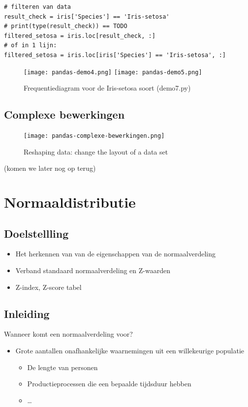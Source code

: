 \documentclass{article}
\begin{document}
\begin{verbatim}
# filteren van data
result_check = iris['Species'] == 'Iris-setosa'
# print(type(result_check)) == TODO
filtered_setosa = iris.loc[result_check, :]
# of in 1 lijn:
filtered_setosa = iris.loc[iris['Species'] == 'Iris-setosa', :]
\end{verbatim}

\begin{figure}[H]
    \centering
    \texttt{[image: pandas-demo4.png]}
    \texttt{[image: pandas-demo5.png]}
    \caption{Frequentiediagram voor de Iris-setosa soort (demo7.py)}
\end{figure}

\subsection{Complexe bewerkingen}

\begin{figure}[H]
    \centering
    \texttt{[image: pandas-complexe-bewerkingen.png]}
    \caption{Reshaping data: change the layout of a data set}
\end{figure}

(komen we later nog op terug)

\section{Normaaldistributie}

\subsection{Doelstellling}

\begin{itemize}
    \item Het herkennen van van de eigenschappen van de normaalverdeling
    \item Verband standaard normaalverdeling en Z-waarden
    \item Z-index, Z-score tabel
\end{itemize}

\subsection{Inleiding}

Wanneer komt een normaalverdeling voor?

\begin{itemize}
    \item Grote aantallen onafhankelijke waarnemingen uit een willekeurige populatie
    \begin{itemize}
        \item De lengte van personen
        \item Productieprocessen die een bepaalde tijdsduur hebben
        \item \dots
    \end{itemize}
\end{itemize}
\end{document}
